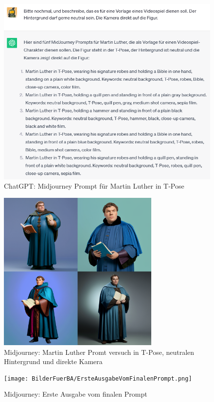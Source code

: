 \begin{figure}
	\centering
	\includegraphics[scale=0.7]{BilderFuerBA/10.png}
	\caption{ChatGPT: Midjourney Prompt für Martin Luther in T-Pose}
	\label{chatgptMartinLutherMJmitNeutralenHintergrund}
\end{figure}
\begin{figure}
	\centering
	\includegraphics[width=8.022cm]{BilderFuerBA/MartinLutherInTPoseFirst.png}
	\caption{Midjourney: Martin Luther Promt versuch in T-Pose, neutralen Hintergrund und direkte Kamera}
	\label{MartinLutherInTPoseNeutralerHintergrundDirekteKamera}
\end{figure}
\begin{figure}
	\centering
	\texttt{[image: BilderFuerBA/ErsteAusgabeVomFinalenPrompt.png]}
	\caption{Midjourney: Erste Ausgabe vom finalen Prompt}
	\label{ErsteAusgabeVomFinalenPrompt}
\end{figure}
